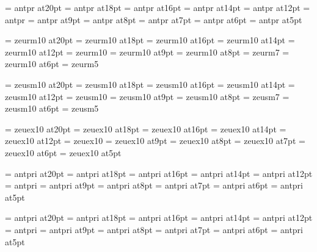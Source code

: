 
\font\twentyrm=     antpr at20pt
\font\eighteenrm=   antpr at18pt
\font\sixteenrm=    antpr at16pt
\font\fourteenrm=   antpr at14pt
\font\twelverm=     antpr at12pt
\font\tenrm=        antpr
\font\ninerm=       antpr at9pt
\font\eightrm=      antpr at8pt
\font\sevenrm=      antpr at7pt
\font\sixrm=        antpr at6pt
\font\fiverm=       antpr at5pt

\font\twentyi=      zeurm10 at20pt
\font\eighteeni=    zeurm10 at18pt
\font\sixteeni=     zeurm10 at16pt
\font\fourteeni=    zeurm10 at14pt
\font\twelvei=      zeurm10 at12pt
\font\teni=         zeurm10
\font\ninei=        zeurm10 at9pt
\font\eighti=       zeurm10 at8pt
\font\seveni=       zeurm7
\font\sixi=         zeurm10 at6pt
\font\fivei=        zeurm5

\font\twentysy=     zeusm10 at20pt
\font\eighteensy=   zeusm10 at18pt
\font\sixteensy=    zeusm10 at16pt
\font\fourteensy=   zeusm10 at14pt
\font\twelvesy=     zeusm10 at12pt
\font\tensy=        zeusm10 
\font\ninesy=       zeusm10 at9pt
\font\eightsy=      zeusm10 at8pt
\font\sevensy=      zeusm7
\font\sixsy=        zeusm10 at6pt
\font\fivesy=       zeusm5

\font\twentyex=     zeuex10 at20pt
\font\eighteenex=   zeuex10 at18pt
\font\sixteenex=    zeuex10 at16pt
\font\fourteenex=   zeuex10 at14pt
\font\twelveex=     zeuex10 at12pt
\font\tenex=        zeuex10
\font\nineex=       zeuex10 at9pt
\font\eightex=      zeuex10 at8pt
\font\sevenex=      zeuex10 at7pt
\font\sixex=        zeuex10 at6pt
\font\fiveex=       zeuex10 at5pt

\font\twentyit=     antpri at20pt
\font\eighteenit=   antpri at18pt
\font\sixteenit=    antpri at16pt
\font\fourteenit=   antpri at14pt
\font\twelveit=     antpri at12pt
\font\tenit=        antpri
\font\nineit=       antpri at9pt
\font\eightit=      antpri at8pt
\font\sevenit=      antpri at7pt
\font\sixit=        antpri at6pt
\font\fiveit=       antpri at5pt

\font\twentysl=     antpri at20pt
\font\eighteensl=   antpri at18pt
\font\sixteensl=    antpri at16pt
\font\fourteensl=   antpri at14pt
\font\twelvesl=     antpri at12pt
\font\tensl=        antpri
\font\ninesl=       antpri at9pt
\font\eightsl=      antpri at8pt
\font\sevensl=      antpri at7pt
\font\sixsl=        antpri at6pt
\font\fivesl=       antpri at5pt

